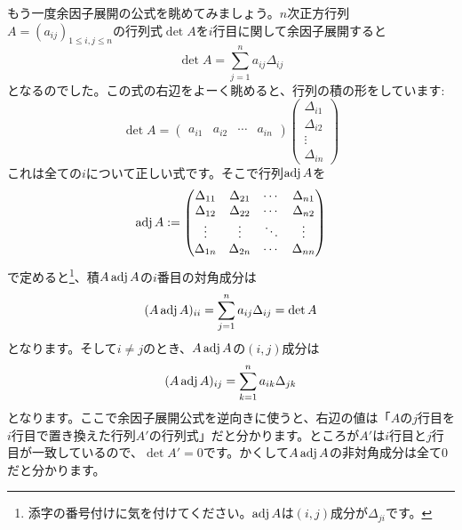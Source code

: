 もう一度余因子展開の公式を眺めてみましょう。$n$次正方行列$A = (a_{ij})_{1 \leq i, j \leq n}$の行列式$\det A$$をi$行目に関して余因子展開すると
\[
\det A = \sum_{j = 1}^n a_{ij} \Delta_{ij}
\]
となるのでした。この式の右辺をよーく眺めると、行列の積の形をしています:
\[
\det A = 
\begin{pmatrix}
a_{i1} & a_{i2} & \cdots & a_{in}
\end{pmatrix}
\begin{pmatrix}
\Delta_{i1} \\
\Delta_{i2} \\
\vdots \\
\Delta_{in}
\end{pmatrix}
\]
これは全ての$i$について正しい式です。そこで行列$\operatorname{adj} A$を
\[
\operatorname{adj} A := 
\begin{pmatrix}
\Delta_{11} & \Delta_{21} & \cdots & \Delta_{n1} \\
\Delta_{12} & \Delta_{22} & \cdots & \Delta_{n2} \\
\vdots & \vdots & \ddots & \vdots \\
\Delta_{1n} & \Delta_{2n} & \cdots & \Delta_{nn}
\end{pmatrix}
\]
で定めると\footnote{添字の番号付けに気を付けてください。$\operatorname{adj} A$は$(i, j)$成分が$\Delta_{ji}$です。}、積$A\operatorname{adj} A$の$i$番目の対角成分は
\[
(A \operatorname{adj} A)_{ii} = \sum_{j = 1}^n a_{ij} \Delta_{ij} = \det A
\]
となります。そして$i \neq j$のとき、$A \operatorname{adj} A$の$(i, j)$成分は
\[
(A \operatorname{adj} A)_{ij} = \sum_{k = 1}^n a_{ik} \Delta_{jk}
\]
となります。ここで余因子展開公式を逆向きに使うと、右辺の値は「$A$の$j$行目を$i$行目で置き換えた行列$A'$の行列式」だと分かります。ところが$A'$は$i$行目と$j$行目が一致しているので、$\det A' = 0$です。かくして$A \operatorname{adj} A$の非対角成分は全て$0$だと分かります。

